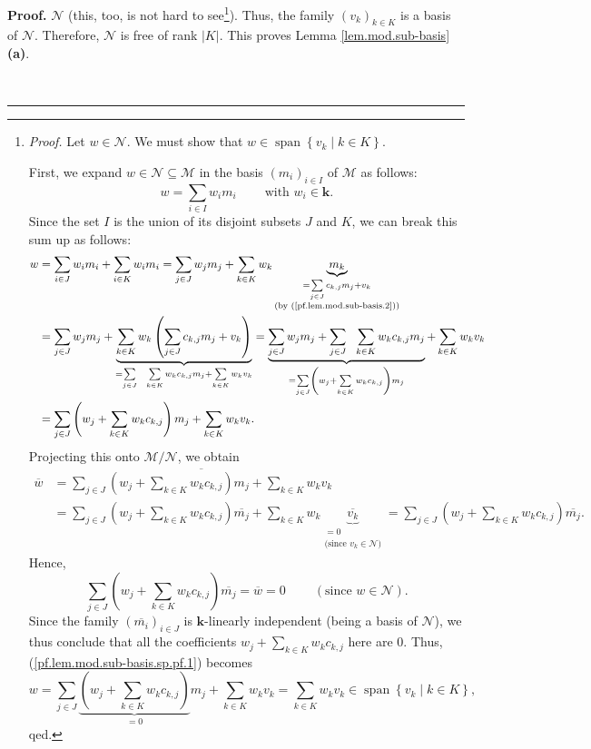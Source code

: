 \documentclass[numbers=enddot,12pt,final,onecolumn,notitlepage]{scrartcl}%
\numberwithin{exer}{subsection}
\theoremstyle{definition}
\newenvironment{proof}[1][Proof]{\noindent\textbf{#1.} }{\ \rule{0.5em}{0.5em}}
\let\sumnonlimits\sum
\renewcommand{\sum}{\sumnonlimits\limits}
\begin{document}
\begin{proof}
$\mathcal{N}$ (this, too, is not hard to see\footnote{\textit{Proof.} Let
$w\in\mathcal{N}$. We must show that $w\in\operatorname*{span}\left\{
v_{k}\mid k\in K\right\}  $.
\par
First, we expand $w\in\mathcal{N}\subseteq\mathcal{M}$ in the basis $\left(
m_{i}\right)  _{i\in I}$ of $\mathcal{M}$ as follows:%
\[
w=\sum_{i\in I}w_{i}m_{i}\ \ \ \ \ \ \ \ \ \ \text{with }w_{i}\in\mathbf{k}.
\]
Since the set $I$ is the union of its disjoint subsets $J$ and $K$, we can
break this sum up as follows:%
\begin{align}
w  &  =\sum_{i\in J}w_{i}m_{i}+\sum_{i\in K}w_{i}m_{i}=\sum_{j\in J}w_{j}%
m_{j}+\sum_{k\in K}w_{k}\underbrace{m_{k}}_{\substack{=\sum_{j\in J}%
c_{k,j}m_{j}+v_{k}\\\text{(by (\ref{pf.lem.mod.sub-basis.2}))}}}\nonumber\\
&  =\sum_{j\in J}w_{j}m_{j}+\underbrace{\sum_{k\in K}w_{k}\left(  \sum_{j\in
J}c_{k,j}m_{j}+v_{k}\right)  }_{=\sum_{j\in J}\ \ \sum_{k\in K}w_{k}%
c_{k,j}m_{j}+\sum_{k\in K}w_{k}v_{k}}=\underbrace{\sum_{j\in J}w_{j}m_{j}%
+\sum_{j\in J}\ \ \sum_{k\in K}w_{k}c_{k,j}m_{j}}_{=\sum_{j\in J}\left(
w_{j}+\sum_{k\in K}w_{k}c_{k,j}\right)  m_{j}}+\sum_{k\in K}w_{k}%
v_{k}\nonumber\\
&  =\sum_{j\in J}\left(  w_{j}+\sum_{k\in K}w_{k}c_{k,j}\right)  m_{j}%
+\sum_{k\in K}w_{k}v_{k}. \label{pf.lem.mod.sub-basis.sp.pf.1}%
\end{align}
Projecting this onto $\mathcal{M}/\mathcal{N}$, we obtain%
\begin{align*}
\overline{w}  &  =\overline{\sum_{j\in J}\left(  w_{j}+\sum_{k\in K}%
w_{k}c_{k,j}\right)  m_{j}+\sum_{k\in K}w_{k}v_{k}}\\
&  =\sum_{j\in J}\left(  w_{j}+\sum_{k\in K}w_{k}c_{k,j}\right)
\overline{m_{j}}+\sum_{k\in K}w_{k}\underbrace{\overline{v_{k}}}%
_{\substack{=0\\\text{(since }v_{k}\in\mathcal{N}\text{)}}}=\sum_{j\in
J}\left(  w_{j}+\sum_{k\in K}w_{k}c_{k,j}\right)  \overline{m_{j}}.
\end{align*}
Hence,%
\[
\sum_{j\in J}\left(  w_{j}+\sum_{k\in K}w_{k}c_{k,j}\right)  \overline{m_{j}%
}=\overline{w}=0\ \ \ \ \ \ \ \ \ \ \left(  \text{since }w\in\mathcal{N}%
\right)  .
\]
Since the family $\left(  \overline{m_{i}}\right)  _{i\in J}$ is $\mathbf{k}%
$-linearly independent (being a basis of $\mathcal{N}$), we thus conclude that
all the coefficients $w_{j}+\sum_{k\in K}w_{k}c_{k,j}$ here are $0$. Thus,
(\ref{pf.lem.mod.sub-basis.sp.pf.1}) becomes
\[
w=\sum_{j\in J}\underbrace{\left(  w_{j}+\sum_{k\in K}w_{k}c_{k,j}\right)
}_{=0}m_{j}+\sum_{k\in K}w_{k}v_{k}=\sum_{k\in K}w_{k}v_{k}\in
\operatorname*{span}\left\{  v_{k}\mid k\in K\right\}  ,
\]
qed.}). Thus, the family $\left(  v_{k}\right)  _{k\in K}$ is a basis of
$\mathcal{N}$. Therefore, $\mathcal{N}$ is free of rank $\left\vert
K\right\vert $. This proves Lemma \ref{lem.mod.sub-basis} \textbf{(a)}.
\medskip


\end{proof}
\end{document}
